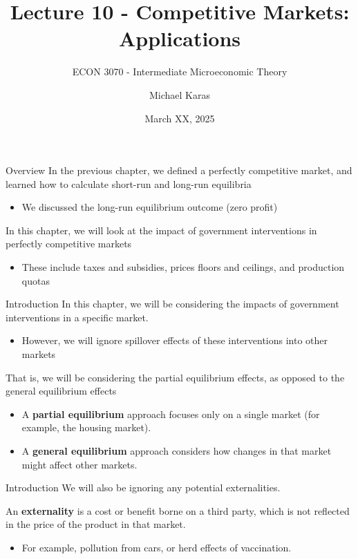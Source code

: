 \documentclass[11pt,t]{beamer}
\author{Michael Karas}
\title{Lecture 10 - Competitive Markets: Applications}
\subtitle{ECON 3070 - Intermediate Microeconomic Theory}
\date{March XX, 2025}
\begin{document}
\begin{frame}
  \titlepage
\end{frame}

\begin{frame}{Overview}
  In the previous chapter, we defined a perfectly competitive market, and learned how to calculate short-run and long-run equilibria

  \begin{itemize}
    \item We discussed the long-run equilibrium outcome (zero profit)
  \end{itemize}

  In this chapter, we will look at the impact of government interventions in perfectly competitive markets

  \begin{itemize}
    \item These include taxes and subsidies, prices floors and ceilings, and production quotas
  \end{itemize}
\end{frame}

\begin{frame}{Introduction}
  In this chapter, we will be considering the impacts of government interventions in a specific market.

  \begin{itemize}
    \item However, we will ignore spillover effects of these interventions into other markets
  \end{itemize}

  \bigskip
  That is, we will be considering the partial equilibrium effects, as opposed to the general equilibrium effects

  \begin{itemize}
    \item A \textbf{partial equilibrium} approach focuses only on a single market (for example, the housing market).
    \item A \textbf{general equilibrium} approach considers how changes in that market might affect other markets.
  \end{itemize}  

\end{frame}

\begin{frame}{Introduction}
  We will also be ignoring any potential externalities.

  \bigskip
  An \textbf{externality} is a cost or benefit borne on a third party, which is not reflected in the price of the product in that market.
  
  \begin{itemize}
    \item For example, pollution from cars, or herd effects of vaccination.
  \end{itemize}
\end{frame}
\end{document}
